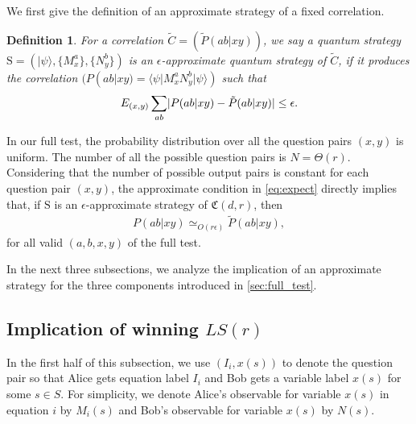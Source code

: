 \documentclass[11pt,letterpaper]{article}
\newcommand{\ket}[1]{|#1\rangle}
\newcommand{\bra}[1]{\langle#1|}
\DeclarePairedDelimiter{\abs}{\lvert}{\rvert}
\newcommand{\1}{\mathbb{1}}
\newcommand{\LS}{LS}
\newcommand{\fC}{\mathfrak{C}}
\newcommand{\bS}{\mathrm{S}}
\newcommand{\pr}[2]{P(#1|#2)}
\newcommand{\tpr}[2]{\tilde{P}(#1|#2)}
\newcommand{\ep}{\epsilon}
\newcommand{\appd}[1]{\simeq_{#1}}
\newtheorem{definition}[theorem]{Definition}
\theoremstyle{definition}
\begin{document}
We first give the definition of an approximate strategy of a fixed correlation.
\begin{definition}
	For a correlation $\tilde{C} = (\tpr{ab}{xy})$,
	we say a quantum strategy $\bS = (\ket{\psi}, \{M_x^a\}, \{N_y^b\})$
	is an $\ep$-approximate quantum strategy of $\tilde{C}$, 
	if it produces the correlation
	$( \pr{ab}{xy} = \bra{\psi} M_x^a N_y^b \ket{\psi} )$ such that
	\begin{align}
	\label{eq:expect}
	E_{(x,y)} \sum_{ab} \abs{\pr{ab}{xy} - \tpr{ab}{xy}} \leq \ep.
	\end{align}
\end{definition}
In our full test, the probability distribution over all the question pairs $(x,y)$ is uniform.
The number of all the possible question pairs is 
$N = \Theta(r)$.
Considering that
the number of possible output pairs is constant for each question pair $(x,y)$, 
the approximate condition in \cref{eq:expect} directly implies that, if $\bS$ is an $\ep$-approximate strategy
of $\fC(d,r)$, then
\begin{align*}
    \pr{ab}{xy} \appd{O(r\ep)} \tpr{ab}{xy},
\end{align*}
for all valid $(a,b,x,y)$ of the full test.

In the next three subsections, we analyze the implication of an approximate strategy for the 
three components introduced in \cref{sec:full_test}.

\subsection{Implication of winning $\LS(r)$}
\label{sec:imp_lct}
In the first half of this subsection, we use $(I_i,x(s))$ to denote the question pair so that Alice gets equation label $I_i$ and Bob gets a variable label $x(s)$ for some $s \in S$. For simplicity, we denote 
Alice's observable for variable $x(s)$ in equation $i$ by $M_i(s)$ and
Bob's observable for variable $x(s)$ by $N(s)$. 
\end{document}
